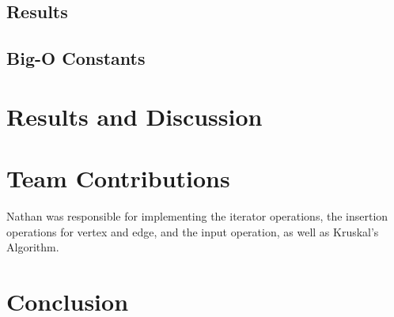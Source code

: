 \documentclass[titlepage]{article}
\begin{document}
\begin{multicols}{2}
			\subsection{Results}
			\subsection{Big-O Constants}
		\section{Results and Discussion}
		\section{Team Contributions}
                Nathan was responsible for implementing the iterator operations, the insertion operations for vertex and edge, and the input operation, as well as Kruskal's Algorithm.
		\section{Conclusion}
	\end{multicols}
\end{document}
